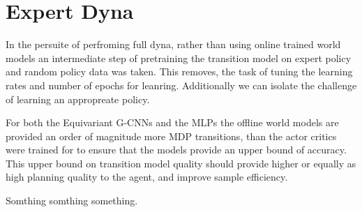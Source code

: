 \section{Expert Dyna}
In the persuite of perfroming full dyna, rather than using online trained world models an intermediate step of pretraining the transition model on expert policy and random policy data was taken. This removes, the task of tuning the learning rates and number of epochs for leanring. Additionally we can isolate the challenge of learning an appropreate policy.

For both the Equivariant G-CNNs and the MLPs the offline world models are provided an order of magnitude more MDP transitions, than the actor critics were trained for to ensure that the models provide an upper bound of accuracy. This upper bound on transition model quality should provide higher or equally as high planning quality to the agent, and improve sample efficiency.  


Somthing somthing something.
